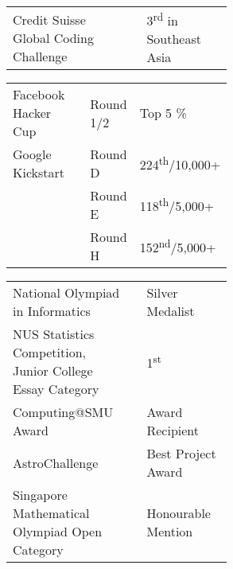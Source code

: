 \documentclass[a4paper,hidelinks]{resume} %
\begin{document}
\begin{minipage}[t]{0.49\textwidth}
    \sectionspace %
    
    
    \begin{tabular}{p{0.55\linewidth} p{0\linewidth} l}
        {Credit Suisse Global Coding \linebreak Challenge} & & 3\textsuperscript{rd} in Southeast Asia \\
    \end{tabular}
    \begin{tabular}{p{0.37\linewidth} p{0.18\linewidth} l}
        Facebook Hacker Cup & Round 1/2 & Top 5 \% \\
        Google Kickstart & Round D & 224\textsuperscript{th}/10,000+ \\
        & Round E & 118\textsuperscript{th}/5,000+\\
        & Round H & 152\textsuperscript{nd}/5,000+ \\
    \end{tabular}
    
    \sectionspace %
    
    
    \begin{tabular}{p{0.55\linewidth} p{0\linewidth} l}
        National Olympiad in Informatics & & Silver Medalist \\
        NUS Statistics Competition, Junior College Essay Category & & 1\textsuperscript{st} \\
        Computing@SMU Award & & Award Recipient\\
        AstroChallenge & & Best Project Award\\
        Singapore Mathematical Olympiad Open Category & & Honourable Mention\\
    \end{tabular}
    
    \sectionspace %


\end{minipage} %
\hfill
%
%
\end{document}
